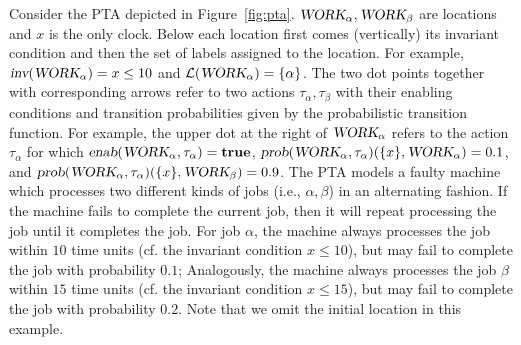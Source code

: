 \begin{example}\label{ex:pta}
Consider the PTA depicted in Figure~\ref{fig:pta}.
$\mbox{\sl WORK}_{\alpha},\mbox{\sl WORK}_{\beta}$ are locations
and $x$ is the only clock. Below each location first comes (vertically) its invariant condition and then the set of labels assigned to the location. For example, $\mbox{\sl inv}(\mbox{\sl WORK}_{\alpha})=x \le 10$
and $\mathcal{L}(\mbox{\sl WORK}_{\alpha})=\{ \alpha \}$.
The two dot points together with corresponding arrows refer to two actions $\tau_\alpha,\tau_\beta$ with their enabling conditions and transition probabilities given by the probabilistic transition function.
For example, the upper dot at the right of $\mbox{\sl WORK}_{\alpha}$ refers to the action $\tau_\alpha$ for which $\mbox{\sl enab}(\mbox{\sl WORK}_{\alpha}, \tau_\alpha)=\mathbf{true}$, $\mbox{\sl prob}(\mbox{\sl WORK}_{\alpha}, \tau_\alpha)(\{x\},\mbox{\sl WORK}_{\alpha})=0.1$, and $\mbox{\sl prob}(\mbox{\sl WORK}_{\alpha}, \tau_\alpha)(\{x\},\mbox{\sl WORK}_{\beta})=0.9$.
The PTA models a faulty machine which processes two different kinds of jobs (i.e., $\alpha,\beta$) in an alternating fashion.
If the machine fails to complete the current job, then it will repeat processing the job until it completes the job.
For job $\alpha$, the machine always processes the job within $10$ time units (cf. the invariant condition $x\le 10$), but may fail to complete the job with probability $0.1$;
Analogously, the machine always processes the job $\beta$ within $15$ time units (cf. the invariant condition $x\le 15$), but may fail to complete the job with probability $0.2$.
Note that we omit the initial location in this example.
\end{example}
%
%

